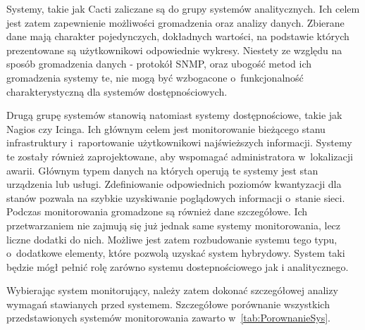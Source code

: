 Systemy, takie jak Cacti zaliczane są do grupy systemów
analitycznych. Ich celem jest zatem zapewnienie możliwości
gromadzenia oraz analizy danych. Zbierane dane mają charakter
pojedynczych, dokładnych wartości, na podstawie których prezentowane
są użytkownikowi odpowiednie wykresy. Niestety ze względu na sposób
gromadzenia danych - protokół SNMP, oraz ubogość metod ich gromadzenia
systemy te, nie mogą być wzbogacone o~funkcjonalność charakterystyczną
dla systemów dostępnościowych.

Drugą grupę systemów stanowią natomiast systemy dostępnościowe, takie
jak Nagios czy Icinga. Ich głównym celem jest monitorowanie bieżącego
stanu infrastruktury i~raportowanie użytkownikowi najświeższych
informacji. Systemy te zostały również zaprojektowane, aby wspomagać
administratora w~lokalizacji awarii. Głównym typem danych na których
operują te systemy jest stan urządzenia lub usługi. Zdefiniowanie
odpowiednich poziomów kwantyzacji dla stanów pozwala na szybkie
uzyskiwanie poglądowych informacji o~stanie sieci. Podczas
monitorowania gromadzone są również dane szczegółowe. Ich
przetwarzaniem nie zajmują się już jednak same systemy monitorowania,
lecz liczne dodatki do nich. Możliwe jest zatem rozbudowanie systemu
tego typu, o~dodatkowe elementy, które pozwolą uzyskać system
hybrydowy. System taki będzie mógł pełnić rolę zarówno systemu
dostepnościowego jak i analitycznego.

Wybierając system monitorujący, należy zatem dokonać szczegółowej
analizy wymagań stawianych przed systemem. Szczegółowe porównanie
wszystkich przedstawionych systemów monitorowania zawarto
w~\ref{tab:PorownanieSys}.

